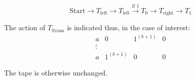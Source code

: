 $$\text{Start} \rightarrow T_{\text{left}} \rightarrow T_{\text{left}} \xrightarrow{\text{if 1}} T_0 \rightarrow T_{\text{right}} \rightarrow T_1$$

The action of $T_{l\text{trans}}$ is indicated thus, in the case of interest:
\[
\begin{array}{c}
a & 0 & 1^{(b+1)} & 0 \\
\vdots \\
a & 1^{(b+1)} & 0 & 0
\end{array}
\]

The tape is otherwise unchanged.
